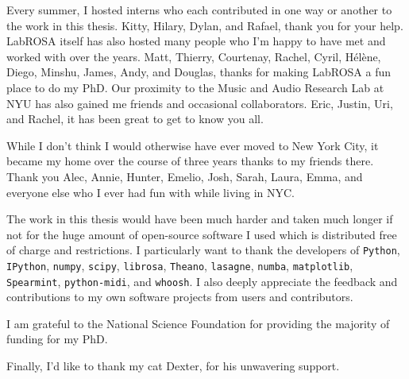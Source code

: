 Every summer, I hosted interns who each contributed in one way or another to the work in this thesis.
Kitty, Hilary, Dylan, and Rafael, thank you for your help.
LabROSA itself has also hosted many people who I'm happy to have met and worked with over the years.
Matt, Thierry, Courtenay, Rachel, Cyril, H{\'e}l{\`e}ne, Diego, Minshu, James, Andy, and Douglas, thanks for making LabROSA a fun place to do my PhD.
Our proximity to the Music and Audio Research Lab at NYU has also gained me friends and occasional collaborators.
Eric, Justin, Uri, and Rachel, it has been great to get to know you all.

While I don't think I would otherwise have ever moved to New York City, it became my home over the course of three years thanks to my friends there.
Thank you Alec, Annie, Hunter, Emelio, Josh, Sarah, Laura, Emma, and everyone else who I ever had fun with while living in NYC.

The work in this thesis would have been much harder and taken much longer if not for the huge amount of open-source software I used which is distributed free of charge and restrictions.
I particularly want to thank the developers of \texttt{Python}, \texttt{IPython}, \texttt{numpy}, \texttt{scipy}, \texttt{librosa}, \texttt{Theano}, \texttt{lasagne}, \texttt{numba}, \texttt{matplotlib}, \texttt{Spearmint}, \texttt{python-midi}, and \texttt{whoosh}.
I also deeply appreciate the feedback and contributions to my own software projects from users and contributors.

I am grateful to the National Science Foundation for providing the majority of funding for my PhD.

Finally, I'd like to thank my cat Dexter, for his unwavering support.
